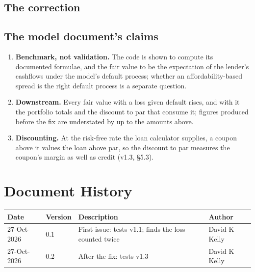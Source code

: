 \documentclass[11pt,a4paper]{article}
\renewcommand{\mkmhistorypage}[1]{%
    \section{Document History}
    \begin{table}[ht]
        \centering
        \begin{tabular}{l|l|p{9cm}|l}
            \textbf{Date} & \textbf{Version} & \textbf{Description} & \textbf{Author} \\
            \hline
            #1
        \end{tabular}
    \end{table}
}
\begin{document}
\subsection{The correction}


\subsection{The model document's claims}


\mkmlimitations

\begin{enumerate}[leftmargin=*]
\item \textbf{Benchmark, not validation.} The code is shown to compute its documented
  formulae, and the fair value to be the expectation of the lender's cashflows under
  the model's default process; whether an affordability-based spread is the right
  default process is a separate question.
\item \textbf{Downstream.} Every fair value with a loss given default rises, and with
  it the portfolio totals and the discount to par that consume it; figures produced
  before the fix are understated by up to the amounts above.
\item \textbf{Discounting.} At the risk-free rate the loan calculator supplies, a
  coupon above it values the loan above par, so the discount to par measures the
  coupon's margin as well as credit (v1.3, \S5.3).
\end{enumerate}

\mkmhistorypage{27-Oct-2026 & 0.1 & First issue: tests v1.1; finds the loss counted twice & David K Kelly \\
27-Oct-2026 & 0.2 & After the fix: tests v1.3 & David K Kelly \\}
\end{document}
